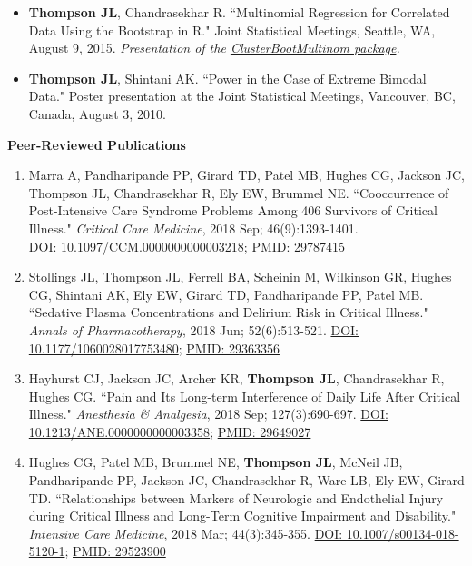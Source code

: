 \documentclass[5pt]{article}
\begin{document}
\begin{itemize}
\item \textbf{Thompson JL}, Chandrasekhar R. ``Multinomial Regression for Correlated Data Using the Bootstrap in R." Joint Statistical Meetings, Seattle, WA, August 9, 2015. \emph{Presentation of the \href{https://github.com/jenniferthompson/ClusterBootMultinom}{ClusterBootMultinom package}.}
\item \textbf{Thompson JL}, Shintani AK. ``Power in the Case of Extreme Bimodal Data." Poster presentation at the Joint Statistical Meetings, Vancouver, BC, Canada, August 3, 2010.
\end{itemize}

\noindent \textbf{Peer-Reviewed Publications}
\begin{enumerate}
\item Marra A, Pandharipande PP, Girard TD, Patel MB, Hughes CG, Jackson JC, Thompson JL, Chandrasekhar R, Ely EW, Brummel NE. ``Cooccurrence of Post-Intensive Care Syndrome Problems Among 406 Survivors of Critical Illness." \emph{Critical Care Medicine}, 2018 Sep; 46(9):1393-1401.\\ \href{https://doi.org/10.1097/CCM.0000000000003218}{DOI: 10.1097/CCM.0000000000003218}; \href{https://www.ncbi.nlm.nih.gov/pubmed/29787415}{PMID: 29787415}
\item Stollings JL, Thompson JL, Ferrell BA, Scheinin M, Wilkinson GR, Hughes CG, Shintani AK, Ely EW, Girard TD, Pandharipande PP, Patel MB. ``Sedative Plasma Concentrations and Delirium Risk in Critical Illness." \emph{Annals of Pharmacotherapy}, 2018 Jun; 52(6):513-521. \href{https://doi.org/10.1177/1060028017753480}{DOI: 10.1177/1060028017753480}; \href{https://www.ncbi.nlm.nih.gov/pubmed/29363356}{PMID: 29363356}
\item Hayhurst CJ, Jackson JC, Archer KR, \textbf{Thompson JL}, Chandrasekhar R, Hughes CG. ``Pain and Its Long-term Interference of Daily Life After Critical Illness." \emph{Anesthesia \& Analgesia}, 2018 Sep; 127(3):690-697. \href{https://doi.org/10.1213/ANE.0000000000003358}{DOI: 10.1213/ANE.0000000000003358}; \href{https://www.ncbi.nlm.nih.gov/pubmed/29649027}{PMID: 29649027}
\item Hughes CG, Patel MB, Brummel NE, \textbf{Thompson JL}, McNeil JB, Pandharipande PP, Jackson JC, Chandrasekhar R, Ware LB, Ely EW, Girard TD. ``Relationships between Markers of Neurologic and Endothelial Injury during Critical Illness and Long-Term Cognitive Impairment and Disability." \emph{Intensive Care Medicine}, 2018 Mar; 44(3):345-355. \href{https://doi.org/10.1007/s00134-018-5120-1}{DOI: 10.1007/s00134-018-5120-1}; \href{https://www.ncbi.nlm.nih.gov/pubmed/29523900}{PMID: 29523900}

\end{enumerate}
\end{document}
